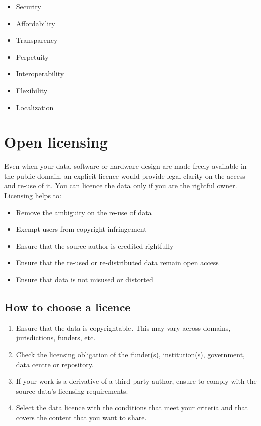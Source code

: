 \documentclass[
]{book}
\providecommand{\tightlist}{%
  \setlength{\itemsep}{0pt}\setlength{\parskip}{0pt}}
\begin{document}
\begin{itemize}
\tightlist
\item
  Security
\item
  Affordability
\item
  Transparency
\item
  Perpetuity
\item
  Interoperability
\item
  Flexibility
\item
  Localization
\end{itemize}

\hypertarget{open-licensing}{%
\section{Open licensing}\label{open-licensing}}

Even when your data, software or hardware design are made freely available in the public domain, an explicit licence would provide legal clarity on the access and re-use of it. You can licence the data only if you are the rightful owner. Licensing helps to:

\begin{itemize}
\tightlist
\item
  Remove the ambiguity on the re-use of data
\item
  Exempt users from copyright infringement
\item
  Ensure that the source author is credited rightfully
\item
  Ensure that the re-used or re-distributed data remain open access
\item
  Ensure that data is not misused or distorted
\end{itemize}

\hypertarget{how-to-choose-a-licence}{%
\subsection*{How to choose a licence}\label{how-to-choose-a-licence}}

\begin{enumerate}
\def\labelenumi{\arabic{enumi}.}
\tightlist
\item
  Ensure that the data is copyrightable. This may vary across domains, jurisdictions, funders, etc.
\item
  Check the licensing obligation of the funder(s), institution(s), government, data centre or repository.
\item
  If your work is a derivative of a third-party author, ensure to comply with the source data's licensing requirements.
\item
  Select the data licence with the conditions that meet your criteria and that covers the content that you want to share.
\end{enumerate}
\end{document}
